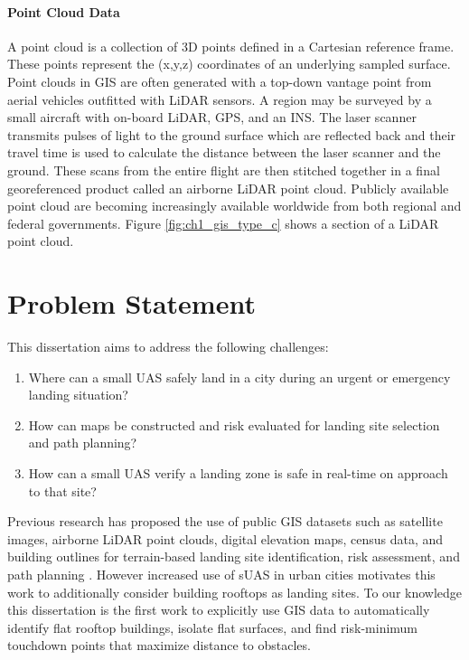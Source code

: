 
\paragraph{Point Cloud Data}
A point cloud is a collection of 3D points defined in a Cartesian reference frame. These points represent the (x,y,z) coordinates of an underlying sampled surface. Point clouds in \ac{GIS} are often generated with a top-down vantage point from aerial vehicles outfitted with \ac{LiDAR} sensors. A region may be surveyed by a small aircraft with on-board \ac{LiDAR}, \ac{GPS}, and an \ac{INS}. The laser scanner transmits pulses of light to the ground surface which are reflected back and their travel time is used to calculate the distance between the laser scanner and the ground. These scans from the entire flight are then stitched together in a final georeferenced product called an airborne \ac{LiDAR} point cloud. Publicly available point cloud are becoming increasingly available worldwide from both regional and federal governments. Figure \ref{fig:ch1_gis_type_c} shows a section of a LiDAR point cloud.


\section{Problem Statement}

This dissertation aims to address the following challenges:

\begin{enumerate}[noitemsep]
    \itemsep0em 
    \item Where can a small UAS safely land in a city during an urgent or emergency landing situation?
    \item How can maps be constructed and risk evaluated for landing site selection and path planning?
    \item How can a small UAS verify a landing zone is safe in real-time on approach to that site?
\end{enumerate}

Previous research has proposed the use of public \ac{GIS} datasets such as satellite images, airborne LiDAR point clouds, digital elevation maps, census data, and building outlines for terrain-based landing site identification, risk assessment, and path planning \cite{meuleau_emergency_2009, di_donato_evaluating_2017, patterson_timely_2014, bleier_risk_2015}.  However increased use of \acf{sUAS} in urban cities motivates this work to additionally consider building rooftops as landing sites. To our knowledge this dissertation is the first work to explicitly use GIS data to automatically identify flat rooftop buildings, isolate flat surfaces, and find risk-minimum touchdown points that maximize distance to obstacles. 

